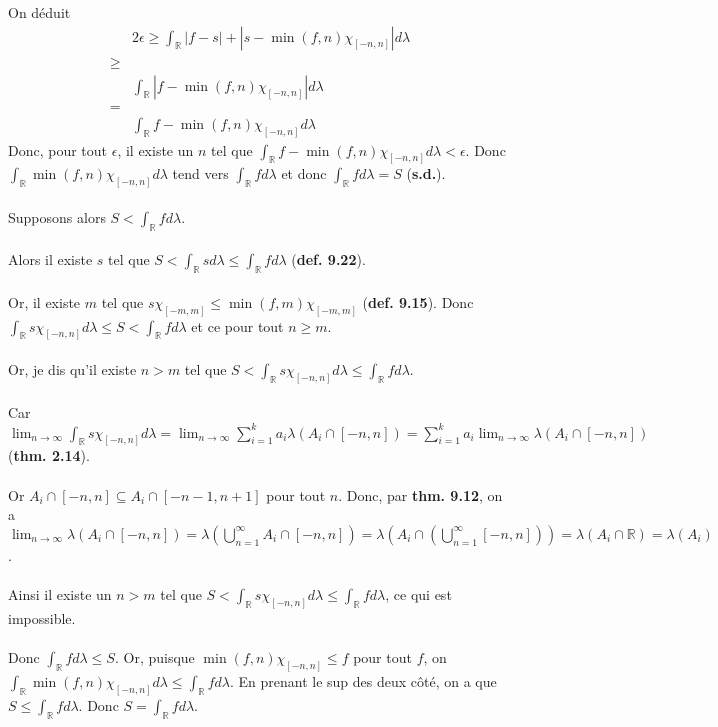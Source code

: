 \documentclass[a4paper,10pt]{article}
\begin{document}
On déduit 
\begin{align*}
	& 2 \epsilon \geq \int_{\mathbb{R}} |f-s| + |s - \min (f,n) \chi_{[-n,n]}| d\lambda \\
	\geq \\
	& \int_\mathbb{R} |f - \min (f,n) \chi_{[-n,n]}| d\lambda \\
	= \\
	& \int_\mathbb{R} f - \min (f,n) \chi_{[-n,n]} d\lambda
\end{align*}
Donc, pour tout $\epsilon$, il existe un $n$ tel que $\int_\mathbb{R} f - \min (f,n) \chi_{[-n,n]} d\lambda < \epsilon$. Donc $\int_\mathbb{R} \min (f,n) \chi_{[-n,n]} d\lambda$ tend vers $\int_\mathbb{R} f d\lambda$ et donc $\int_\mathbb{R} f d\lambda = S$ (\textbf{s.d.}).
\\
\\
Supposons alors $S < \int_\mathbb{R} f d\lambda$.
\\
\\
Alors il existe $s$ tel que $S < \int_\mathbb{R} s d\lambda \leq \int_\mathbb{R} f d\lambda$ (\textbf{def. 9.22}).
\\
\\
Or, il existe $m$ tel que $s \chi_{[-m,m]} \leq \min (f,m) \chi_{[-m,m]}$ (\textbf{def. 9.15}). Donc $\int_\mathbb{R} s \chi_{[-n,n]} d\lambda \leq S < \int_\mathbb{R} f d\lambda$ et ce pour tout $n \geq m$.
\\
\\
Or, je dis qu'il existe $n > m$ tel que $S < \int_\mathbb{R} s \chi_{[-n,n]} d\lambda \leq \int_\mathbb{R} f d\lambda$. 
\\
\\
Car $\lim_{n \to \infty} \int_\mathbb{R} s \chi_{[-n,n]} d\lambda = \lim_{n \to \infty} \sum_{i=1}^k a_i \lambda (A_i \cap [-n,n]) = \sum_{i=1}^k a_i \lim_{n\to \infty} \lambda( A_i \cap [-n,n])$ (\textbf{thm. 2.14}).
\\
\\
Or $A_i \cap [-n,n] \subseteq A_i \cap [-n-1, n+1]$ pour tout $n$. Donc, par \textbf{thm. 9.12}, on a $\lim_{n \to \infty} \lambda (A_i \cap [-n,n]) = \lambda \left(\bigcup^\infty_{n=1} A_i \cap [-n,n] \right) = \lambda \left( A_i \cap \left(\bigcup_{n=1}^\infty [-n,n] \right) \right) = \lambda (A_i \cap \mathbb{R}) = \lambda (A_i)$.
\\
\\
Ainsi il existe un $n > m$ tel que $S < \int_\mathbb{R} s\chi_{[-n,n]} d\lambda \leq \int_\mathbb{R} f d\lambda$, ce qui est impossible.
\\
\\
Donc $\int_\mathbb{R} f d\lambda \leq S$. Or, puisque $\min (f,n) \chi_{[-n,n]} \leq f$ pour tout $f$, on $\int_\mathbb{R} \min (f,n) \chi_{[-n,n]} d\lambda \leq \int_\mathbb{R} f d\lambda$. En prenant le sup des deux côté, on a que $S \leq \int_\mathbb{R} f d\lambda$. Donc $S = \int_\mathbb{R} f d\lambda$.
\end{document}
